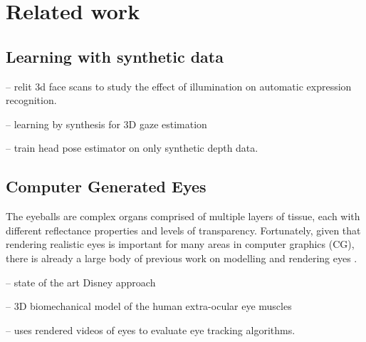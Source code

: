 
\section{Related work}

\subsection{Learning with synthetic data}

\cite{stratou2011effect} -- relit 3d face scans to study the effect of illumination on automatic expression recognition.

\cite{sugano2014learning} -- learning by synthesis for 3D gaze estimation

\cite{fanelli2011real} -- train head pose estimator on only synthetic depth data.

\subsection{Computer Generated Eyes}

The eyeballs are complex organs comprised of multiple layers of tissue, each with different reflectance properties and levels of transparency.
Fortunately, given that rendering realistic eyes is important for many areas in computer graphics (CG), there is already a large body of previous work on modelling and rendering eyes \cite{ruhland2014look}.

\cite{berard2014highquality} -- state of the art Disney approach


\cite{priamikov14_openeyesim} -- 3D biomechanical model of the human extra-ocular eye muscles

\cite{swirski2014rendering} -- uses rendered videos of eyes to evaluate eye tracking algorithms.




